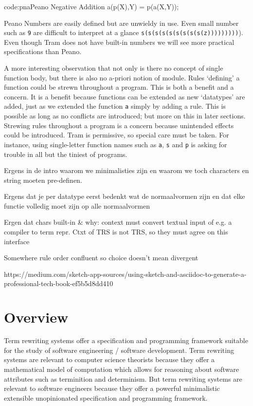 \documentclass[11pt,twoside]{memoir}
\def\T{\texttt}
\begin{document}
\begin{introcode}{code:pna}{Peano Negative Addition}
a(p(X),Y) = p(a(X,Y));
\end{introcode}

Peano Numbers are easily defined but are unwieldy in use. Even small number such as \T{9} are difficult to interpret at a glance \T{s(s(s(s(s(s(s(s(s(z)))))))))}). Even though Tram does not have built-in numbers we will see more practical specifications than Peano.

A more interesting observation that not only is there no concept of single function body, but there is also no a-priori notion of module. Rules `defining' a function could be strewn throughout a program. This is both a benefit and a concern. It is a benefit because functions can be extended as new `datatypes' are added, just as we extended the function \T{a} simply by adding a rule. This is possible as long as no conflicts are introduced; but more on this in later sections. Strewing rules throughout a program is a concern because unintended effects could be introduced. Tram is permissive, so special care must be taken. For instance, using single-letter function names such as \T{a}, \T{s} and \T{p} is asking for trouble in all but the tiniest of programs.


Ergens in de intro waarom we minimalisties zijn en waarom we toch characters en string moeten pre-definen.

Ergens dat je per datatype eerst bedenkt wat de normaalvormen zijn en dat elke functie volledig moet zijn op alle normaalvormen

Ergen dat chars built-in \& why: context must convert textual input of e.g. a compiler to term repr. Ctxt of TRS is not TRS, so they must agree on this interface

Somewhere
rule order
confluent so choice doesn't mean divergent

https://medium.com/sketch-app-sources/using-sketch-and-asciidoc-to-generate-a-professional-tech-book-ef5b5d8dd410

\section*{Overview}

Term rewriting systems offer a specification and programming framework suitable for the study of software engineering / software development. Term rewriting systems are relevant to computer science theorists because they offer a mathematical model of computation which allows for reasoning about software attributes such as terminition and determinism. But term rewriting systems are relevant to software engineers because they offer a powerful minimalistic extensible unopinionated specification and programming framework.
\end{document}
